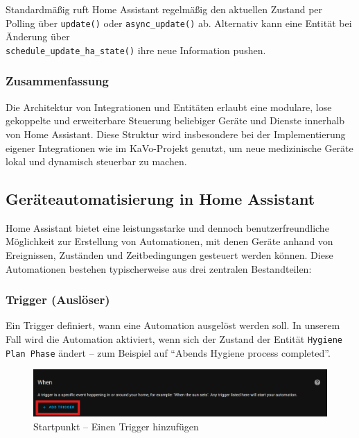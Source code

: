 Standardmäßig ruft Home Assistant regelmäßig den aktuellen Zustand per Polling über \texttt{update()} oder \texttt{async\_update()} ab. Alternativ kann eine Entität bei Änderung über \\ \texttt{schedule\_update\_ha\_state()} ihre neue Information pushen.

\subsubsection{Zusammenfassung}

Die Architektur von Integrationen und Entitäten erlaubt eine modulare, lose gekoppelte und erweiterbare Steuerung beliebiger Geräte und Dienste innerhalb von Home Assistant. Diese Struktur wird insbesondere bei der Implementierung eigener Integrationen wie im KaVo-Projekt genutzt, um neue medizinische Geräte lokal und dynamisch steuerbar zu machen.

\subsection{Geräteautomatisierung in Home Assistant}

Home Assistant bietet eine leistungsstarke und dennoch benutzerfreundliche Möglichkeit zur Erstellung von Automationen, mit denen Geräte anhand von Ereignissen, Zuständen und Zeitbedingungen gesteuert werden können. Diese Automationen bestehen typischerweise aus drei zentralen Bestandteilen:

\subsubsection{Trigger (Auslöser)}
Ein Trigger definiert, wann eine Automation ausgelöst werden soll. In unserem Fall wird die Automation aktiviert, wenn sich der Zustand der Entität \texttt{Hygiene Plan Phase} ändert – zum Beispiel auf \enquote{Abends Hygiene process completed}.

\begin{figure}[H]
    \centering
    \includegraphics[width=\linewidth]{images/auto_addtrig1.png}
    \caption{Startpunkt – Einen Trigger hinzufügen}
\end{figure}

